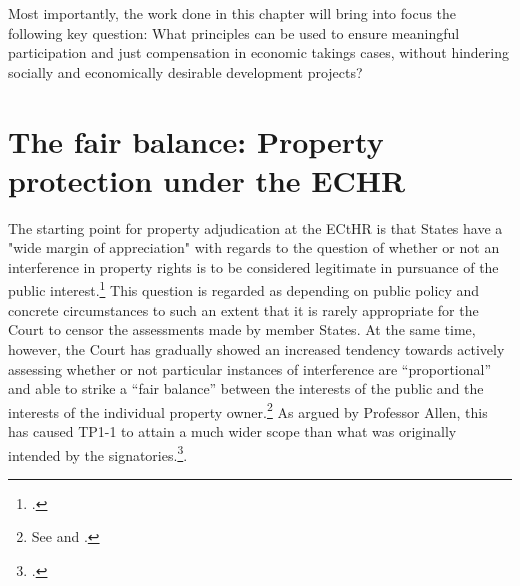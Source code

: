 Most importantly, the work done in this chapter will bring into focus the following key question: What principles can be used to ensure meaningful participation and just compensation in economic takings cases, without hindering socially and economically desirable development projects?



\section{The fair balance: Property protection under the ECHR}

The starting point for property adjudication at the ECtHR is that States have a "wide margin of appreciation" with regards to the question of whether or not an interference in property rights is to be considered legitimate in pursuance of the public interest.\footcite[See][54]{james86} This question is regarded as depending on public policy and concrete circumstances to such an extent that it is rarely appropriate for the Court to censor the assessments made by member States. At the same time, however, the Court has gradually showed an increased tendency towards actively assessing whether or not particular instances of interference are ``proportional'' and able to strike a ``fair balance'' between the interests of the public and the interests of the individual property owner.\footnote{See \cite[69]{sporrong82} and \cite[120]{james86}.}  As argued by Professor Allen, this has caused TP1-1 to attain a much wider scope than what was originally intended by the signatories.\footcite[1055]{allen10}.

